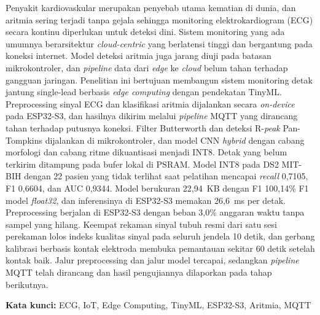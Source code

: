 Penyakit kardiovaskular merupakan penyebab utama kematian di dunia, dan aritmia sering terjadi tanpa gejala sehingga monitoring elektrokardiogram (ECG) secara kontinu diperlukan untuk deteksi dini. Sistem monitoring yang ada umumnya berarsitektur \textit{cloud-centric} yang berlatensi tinggi dan bergantung pada koneksi internet. Model deteksi aritmia juga jarang diuji pada batasan mikrokontroler, dan \textit{pipeline} data dari \textit{edge} ke \textit{cloud} belum tahan terhadap gangguan jaringan. Penelitian ini bertujuan membangun sistem monitoring detak jantung single-lead berbasis \textit{edge computing} dengan pendekatan TinyML. Preprocessing sinyal ECG dan klasifikasi aritmia dijalankan secara \textit{on-device} pada ESP32-S3, dan hasilnya dikirim melalui \textit{pipeline} MQTT yang dirancang tahan terhadap putusnya koneksi. Filter Butterworth dan deteksi R-\textit{peak} Pan-Tompkins dijalankan di mikrokontroler, dan model CNN \textit{hybrid} dengan cabang morfologi dan cabang ritme dikuantisasi menjadi INT8. Detak yang belum terkirim ditampung pada bufer lokal di PSRAM. Model INT8 pada DS2 MIT-BIH dengan 22 pasien yang tidak terlihat saat pelatihan mencapai \textit{recall} 0,7105, F1 0,6604, dan AUC 0,9344. Model berukuran 22,94~KB dengan F1 100,14\% F1 model \textit{float32}, dan inferensinya di ESP32-S3 memakan 26,6~ms per detak. Preprocessing berjalan di ESP32-S3 dengan beban 3,0\% anggaran waktu tanpa sampel yang hilang. Keempat rekaman sinyal tubuh resmi dari satu sesi perekaman lolos indeks kualitas sinyal pada seluruh jendela 10 detik, dan gerbang kalibrasi berbasis kontak elektroda membuka pemantauan sekitar 60 detik setelah kontak baik. Jalur preprocessing dan jalur model tercapai, sedangkan \textit{pipeline} MQTT telah dirancang dan hasil pengujiannya dilaporkan pada tahap berikutnya.

\vspace{0.25cm}
\noindent
\textbf{Kata kunci:} ECG, IoT, Edge Computing, TinyML, ESP32-S3, Aritmia, MQTT

\clearpage

